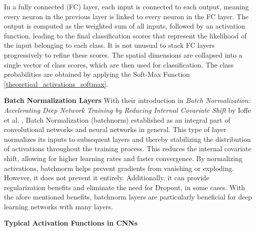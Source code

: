 In a fully connected (FC) layer, each input is connected to each output, meaning every neuron in the previous layer is linked to every neuron in the FC layer. The output is computed as the weighted sum of all inputs, followed by an activation function, leading to the final classification scores that represent the likelihood of the input belonging to each class. It is not unusual to stack FC layers progressively to refine these scores. The spatial dimensions are collapsed into a single vector of class scores, which are then used for classification. The class probabilities are obtained by applying the Soft-Max Function \ref{theoretical_activations_softmax}.

\textbf{Batch Normalization Layers}\label{theoretical_classification_batchnorm_layers}
With their introduction in \textit{Batch Normalization: Accelerating Deep Network Training by Reducing Internal Covariate Shift} by Ioffe et al. \cite{ioffe2015batchnormalizationacceleratingdeep}, Batch Normalization (batchnorm) established as an integral part of convolutional networks and neural networks in general. This type of layer normalizes its inputs to subsequent layers and thereby stabilizing the distribution of activations throughout the training process. This reduces the internal covariate shift, allowing for higher learning rates and faster convergence. By normalizing activations, batchnorm helps prevent gradients from vanishing or exploding. However, it does not prevent it entirely. Additionally, it can provide regularization benefits and eliminate the need for Dropout, in some cases. With the afore mentioned benefits, batchnorm layers are particularly beneficial for deep learning networks with many layers.


\textbf{Typical Activation Functions in CNNs}

